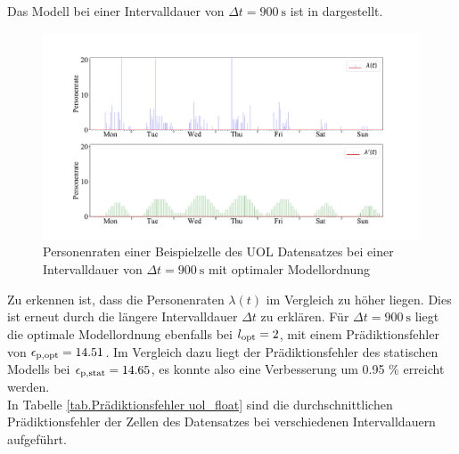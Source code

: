 Das Modell bei einer Intervalldauer von $\Delta t = \SI{900}{\second}$ ist in  dargestellt. 
\begin{figure}[!h]
	\centering
	\includegraphics[width=1.0\linewidth]{Abbildungen/evaluation/bin_size_influence_cell_row_23_col_25_float_900}
	\caption{Personenraten einer Beispielzelle des UOL Datensatzes bei einer Intervalldauer von $\Delta t = \SI{900}{\second}$ mit optimaler Modellordnung}
	\label{fig.bin_size_influence_cell_row_23_col_25_float_900}
\end{figure}

Zu erkennen ist, dass die Personenraten $\lambda (t)$ im Vergleich zu  höher liegen. Dies ist erneut durch die längere Intervalldauer $\Delta t$ zu erklären. Für $\Delta t = \SI{900}{\second}$ liegt die optimale Modellordnung ebenfalls bei $l_{\mathrm{opt}} = 2$, mit einem Prädiktionsfehler von $\epsilon_{\mathrm{p,opt}} = 14.51$. Im Vergleich dazu liegt der Prädiktionsfehler des statischen Modells bei $\epsilon_{\mathrm{p,stat}} = 14.65$, es konnte also eine Verbesserung um 0.95 \% erreicht werden. \\
In Tabelle \ref{tab.Prädiktionsfehler uol_float} sind die durchschnittlichen Prädiktionsfehler der Zellen des Datensatzes bei verschiedenen Intervalldauern aufgeführt.

